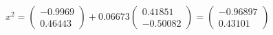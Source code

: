 $
x^{2} = 
\begin{pmatrix}
  -0.9969\\
  0.46443
\end{pmatrix}
+ 0.06673
\begin{pmatrix}
  0.41851\\
  -0.50082
\end{pmatrix}
=
\begin{pmatrix}
  -0.96897\\
  0.43101
\end{pmatrix}
$

\pagebreak